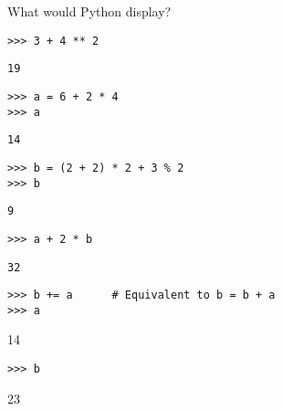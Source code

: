 \question What would Python display?
\begin{lstlisting}
>>> 3 + 4 ** 2
\end{lstlisting}
\begin{solution}
\begin{lstlisting}
19
\end{lstlisting}
\end{solution}

\begin{lstlisting}
>>> a = 6 + 2 * 4
>>> a
\end{lstlisting}
\begin{solution}
\begin{lstlisting}
14
\end{lstlisting}
\end{solution}

\begin{lstlisting}
>>> b = (2 + 2) * 2 + 3 % 2
>>> b
\end{lstlisting}
\begin{solution}
\begin{lstlisting}
9
\end{lstlisting}
\end{solution}

\begin{lstlisting}
>>> a + 2 * b
\end{lstlisting}
\begin{solution}
\begin{lstlisting}
32
\end{lstlisting}
\end{solution}

\begin{lstlisting}
>>> b += a      # Equivalent to b = b + a
>>> a
\end{lstlisting}
\begin{solution}
14
\end{solution}

\begin{lstlisting}
>>> b
\end{lstlisting}
\begin{solution}
23
\end{solution}
